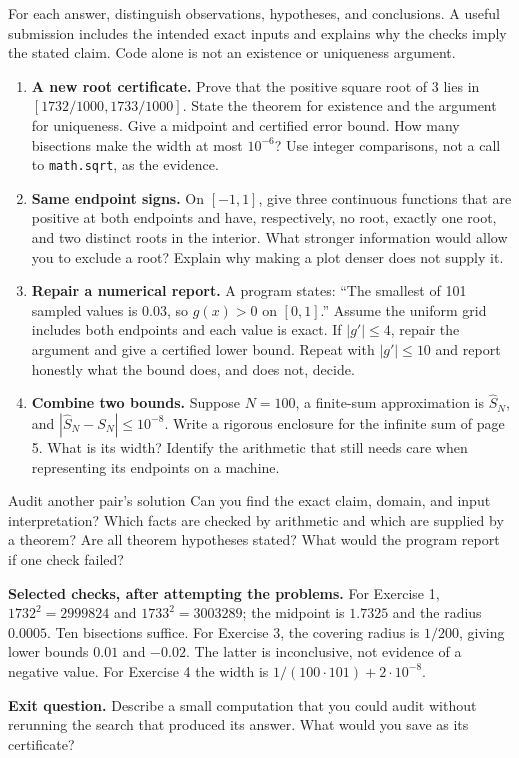\newpage
{}
For each answer, distinguish observations, hypotheses, and conclusions. A useful
submission includes the intended exact inputs and explains why the checks imply
the stated claim. Code alone is not an existence or uniqueness argument.
\begin{enumerate}
\item \textbf{A new root certificate.} Prove that the positive square root of $3$
lies in $[1732/1000,1733/1000]$. State the theorem for existence and the argument
for uniqueness. Give a midpoint and certified error bound. How many bisections
make the width at most $10^{-6}$? Use integer comparisons, not a call to
\texttt{math.sqrt}, as the evidence.
\item \textbf{Same endpoint signs.} On $[-1,1]$, give three continuous functions
that are positive at both endpoints and have, respectively, no root, exactly one
root, and two distinct roots in the interior. What stronger information would
allow you to exclude a root? Explain why making a plot denser does not supply it.
\item \textbf{Repair a numerical report.} A program states: ``The smallest of
101 sampled values is $0.03$, so $g(x)>0$ on $[0,1]$.'' Assume the uniform grid
includes both endpoints and each value is exact. If $|g'|\le4$, repair the
argument and give a certified lower bound. Repeat with $|g'|\le10$ and report
honestly what the bound does, and does not, decide.
\item \textbf{Combine two bounds.} Suppose $N=100$, a finite-sum approximation is
$\widehat S_N$, and $|\widehat S_N-S_N|\le10^{-8}$. Write a rigorous enclosure
for the infinite sum of page 5. What is its width? Identify the arithmetic that
still needs care when representing its endpoints on a machine.
\end{enumerate}
\begin{question}{Audit another pair's solution}
Can you find the exact claim, domain, and input interpretation? Which facts are
checked by arithmetic and which are supplied by a theorem? Are all theorem
hypotheses stated? What would the program report if one check failed?
\end{question}
\textbf{Selected checks, after attempting the problems.}
For Exercise 1, $1732^2=2999824$ and $1733^2=3003289$;
the midpoint is $1.7325$ and the radius $0.0005$. Ten bisections suffice.
For Exercise 3, the covering radius is $1/200$, giving lower bounds $0.01$
and $-0.02$. The latter is inconclusive, not evidence of a negative value.
For Exercise 4 the width is $1/(100\cdot101)+2\cdot10^{-8}$.

\textbf{Exit question.} Describe a small computation that you could audit without
rerunning the search that produced its answer. What would you save as its certificate?


